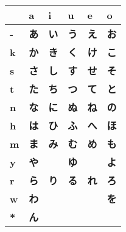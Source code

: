 


\bigskip
\begin{center}	
\Huge

\begin{tabular}{m{1.0cm}||m{1.0cm}|m{1.0cm}|m{1.0cm}|m{1.0cm}|m{1.0cm}|}
& \textbf{a}& \textbf{i}& \textbf{u}& \textbf{e}& \textbf{o}\\ \hline \hline 
\textbf{-}&\smallskip\textbf{あ}&\smallskip\textbf{い}&\smallskip\textbf{う}&\smallskip\textbf{え}&\smallskip\textbf{お}\\ \hline 
\textbf{k}&\smallskip\textbf{か}&\smallskip\textbf{き}&\smallskip\textbf{く}&\smallskip\textbf{け}&\smallskip\textbf{こ}\\ \hline 
\textbf{s}&\smallskip\textbf{さ}&\smallskip\textbf{し}&\smallskip\textbf{す}&\smallskip\textbf{せ}&\smallskip\textbf{そ}\\ \hline 
\textbf{t}&\smallskip\textbf{た}&\smallskip\textbf{ち}&\smallskip\textbf{つ}&\smallskip\textbf{て}&\smallskip\textbf{と}\\ \hline 
\textbf{n}&\smallskip\textbf{な}&\smallskip\textbf{に}&\smallskip\textbf{ぬ}&\smallskip\textbf{ね}&\smallskip\textbf{の}\\ \hline 
\textbf{h}&\smallskip\textbf{は}&\smallskip\textbf{ひ}&\smallskip\textbf{ふ}&\smallskip\textbf{へ}&\smallskip\textbf{ほ}\\ \hline 
\textbf{m}&\smallskip\textbf{ま}&\smallskip\textbf{み}&\smallskip\textbf{む}&\smallskip\textbf{め}&\smallskip\textbf{も}\\ \hline 
\textbf{y}&\smallskip\textbf{や}&\smallskip   &\smallskip\textbf{ゆ}&\smallskip   &\smallskip\textbf{よ}\\ \hline 
\textbf{r}&\smallskip\textbf{ら}&\smallskip\textbf{り}&\smallskip\textbf{る}&\smallskip\textbf{れ}&\smallskip\textbf{ろ}\\ \hline 
\textbf{w}&\smallskip\textbf{わ}&\smallskip   &\smallskip   &\smallskip   &\smallskip\textbf{を}\\ \hline 
\textbf{*}&\smallskip\textbf{ん}&\smallskip   &\smallskip   &\smallskip   &\smallskip   \\ \hline 
\end{tabular}
\end{center}
